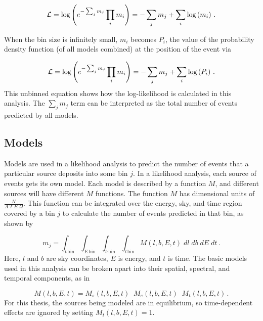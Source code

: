\begin{equation}\label{eqn:simple_like_7}
  \mathcal{L} = \textrm{log} \left ( e^{- \sum_j m_j} \prod_i m_i \right ) = - \sum_j m_j + \sum_i \textrm{log} \left ( m_i \right ) \,.
\end{equation}

When the bin size is infinitely small, $m_i$ becomes $P_i$, the value of the probability density function (of all models combined) at the position of the event via

\begin{equation}\label{eqn:simple_like_8}
  \mathcal{L} = \textrm{log} \left ( e^{- \sum_j m_j} \prod_i m_i \right ) = - \sum_j m_j + \sum_i \textrm{log} \left ( P_i \right ) \,.
\end{equation}
This unbinned equation shows how the log-likelihood is calculated in this analysis.
The $\sum_{j} m_{j}$ term can be interpreted as the total number of events predicted by all models.

\subsection{Models}\label{sec:model_irf_folding}

Models are used in a likelihood analysis to predict the number of events that a particular source deposits into some bin $j$.
In a likelihood analysis, each source of events gets its own model.
Each model is described by a function $M$, and different sources will have different $M$ functions.
The function $M$ has dimensional units of $\frac{N}{A \; T \; E \; \Omega}$.
This function can be integrated over the energy, sky, and time region covered by a bin $j$ to calculate the number of events predicted in that bin, as shown by 

\begin{equation}\label{eqn:model_int}
  m_{j} = \int_{t\,\textrm{bin}} \int_{E\,\textrm{bin}} \int_{b\,\textrm{bin}} \int_{l\,\textrm{bin}} M(l,b,E,t)\; dl \; db \; dE \; dt \,.
\end{equation}
Here, $l$ and $b$ are sky coordinates, $E$ is energy, and $t$ is time.
The basic models used in this analysis can be broken apart into their spatial, spectral, and temporal components, as in

\begin{equation}\label{eqn:modelparts}
  M(l,b,E,t) = M_s(l,b,E,t) \; \; M_e(l,b,E,t) \; \; M_t(l,b,E,t) \,.
\end{equation}
For this thesis, the sources being modeled are in equilibrium, so time-dependent effects are ignored by setting $M_{t}(l,b,E,t) = 1$.

